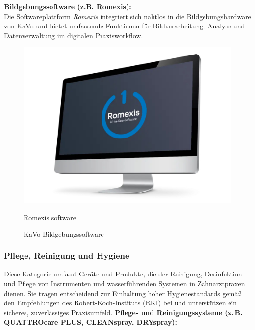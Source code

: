 \textbf{Bildgebungssoftware (z.B. Romexis):} \\
Die Softwareplattform \textit{Romexis} integriert sich nahtlos in die Bildgebungshardware von KaVo und bietet umfassende Funktionen für Bildverarbeitung, Analyse und Datenverwaltung im digitalen Praxisworkflow.
\vspace{1em}
\begin{figure}[H]
  \centering
  \begin{minipage}[b]{0.35\textwidth}
    \centering
    \includegraphics[width=\textwidth]{images/Romexis-Screen_2500px.jpg}
    \caption*{Romexis software}
  \end{minipage}
  \hspace{0.05\textwidth}
  \caption{KaVo Bildgebungssoftware}
  \label{fig:Bildgebungssoftware}
\end{figure}
\vspace{1em}

\subsubsection{Pflege, Reinigung und Hygiene}

Diese Kategorie umfasst Geräte und Produkte, die der Reinigung, Desinfektion und Pflege von Instrumenten und wasserführenden Systemen in Zahnarztpraxen dienen. Sie tragen entscheidend zur Einhaltung hoher Hygienestandards gemäß den Empfehlungen des Robert-Koch-Instituts (RKI) bei und unterstützen ein sicheres, zuverlässiges Praxisumfeld.
\newline
\newline
\newline
\textbf{Pflege- und Reinigungssysteme (z.\,B. QUATTROcare PLUS, CLEANspray, DRYspray):}

